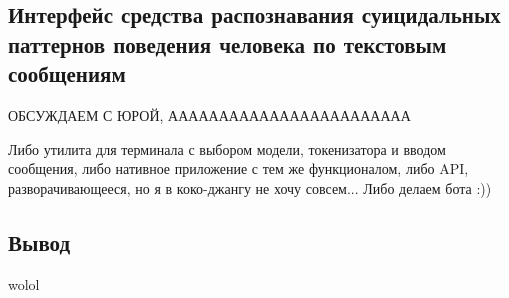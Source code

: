 \subsection{Интерфейс средства распознавания суицидальных паттернов поведения человека по текстовым сообщениям}

ОБСУЖДАЕМ С ЮРОЙ, АААААААААААААААААААААААА

Либо утилита для терминала с выбором модели, токенизатора и вводом сообщения, либо нативное приложение с тем же функционалом, либо API, разворачивающееся, но я в коко-джангу не хочу совсем... Либо делаем бота :))

\subsection*{Вывод}

wolol